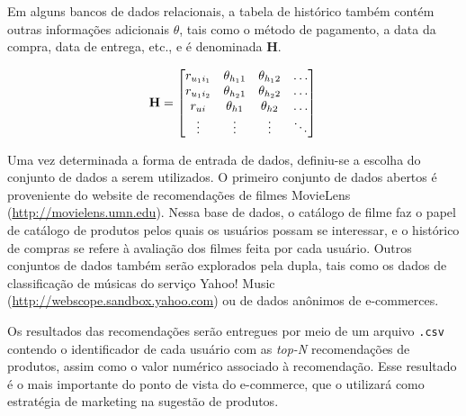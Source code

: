 Em alguns bancos de dados relacionais, a tabela de histórico também contém outras informações adicionais $\theta$, tais como o método de pagamento, a data da compra, data de entrega, etc., e é denominada $\mathbf{H}$.

\begin{equation} 
\mathbf{H} =
\begin{bmatrix} 
 r_{u_1 i_1} &  \theta_{h_1 1} &  \theta_{h_1 2} & \dots   \\
 r_{u_1 i_2} &  \theta_{h_2 1} &  \theta_{h_2 2} & \dots   \\
 r_{u i} &  \theta_{h 1} &  \theta_{h 2} & \dots   \\
 \vdots &  \vdots &  \vdots  & \ddots   \\
 \end{bmatrix} \\
\end{equation}

Uma vez determinada a forma de entrada de dados, definiu-se a escolha do conjunto de dados a serem utilizados. O primeiro conjunto de dados abertos é proveniente do website de recomendações de filmes MovieLens (\url{http://movielens.umn.edu}). Nessa base de dados, o catálogo de filme faz o papel de catálogo de produtos pelos quais os usuários possam se interessar, e o histórico de compras se refere à avaliação dos filmes feita por cada usuário. Outros conjuntos de dados também serão  explorados pela dupla, tais como os dados de classificação de músicas do serviço Yahoo! Music (\url{http://webscope.sandbox.yahoo.com}) ou de dados anônimos de e-commerces.

Os resultados das recomendações serão entregues por meio de um arquivo \texttt{.csv} contendo o identificador de cada usuário com as \textit{top-N} recomendações de produtos, assim como o valor numérico associado à recomendação. Esse resultado é o mais importante do ponto de vista do e-commerce, que o utilizará como estratégia de marketing na sugestão de produtos.